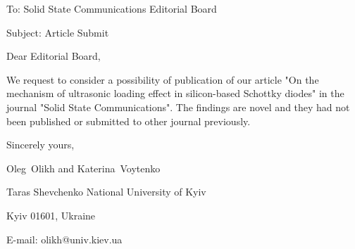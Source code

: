 \documentclass[preprint]{elsarticle}
\begin{document}
To:
Solid State Communications Editorial Board


Subject:
Article Submit

\vspace{5mm}
Dear Editorial Board,

\vspace{3mm}
We request to consider a possibility of publication of our article "On the mechanism of ultrasonic loading effect in silicon-based Schottky diodes" in the journal "Solid State Communications".
The findings are novel and they had not been published or submitted to other journal previously.


\vspace{3mm}

Sincerely yours,

Oleg~Olikh and Katerina~Voytenko


Taras Shevchenko National University of Kyiv


Kyiv 01601, Ukraine

E-mail: olikh@univ.kiev.ua
\end{document}
